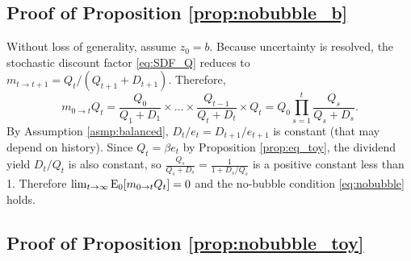 \documentclass[a4paper,12pt]{article}
\numberwithin{equation}{section}
\theoremstyle{plain}
\begin{document}
\subsection{Proof of Proposition \ref{prop:nobubble_b}}

Without loss of generality, assume $z_0=b$. Because uncertainty is resolved, the stochastic discount factor \eqref{eq:SDF_Q} reduces to $m_{t\to t+1}=Q_t/(Q_{t+1}+D_{t+1})$. Therefore,
\begin{equation}
    m_{0\to t}Q_t=\frac{Q_0}{Q_1+D_1}\times\dots\times \frac{Q_{t-1}}{Q_t+D_t}\times Q_t=Q_0\prod_{s=1}^t\frac{Q_s}{Q_s+D_s}. \label{eq:mQ_b}
\end{equation}
By Assumption \ref{asmp:balanced}, $D_t/e_t=D_{t+1}/e_{t+1}$ is constant (that may depend on history). Since $Q_t=\beta e_t$ by Proposition \ref{prop:eq_toy}, the dividend yield $D_t/Q_t$ is also constant, so $\frac{Q_s}{Q_s+D_s}=\frac{1}{1+D_s/Q_s}$ is a positive constant less than 1. Therefore $\lim_{t\to\infty}\operatorname{E}_0[m_{0\to t}Q_t]=0$ and the no-bubble condition \eqref{eq:nobubble} holds. \hfill \qedsymbol

\subsection{Proof of Proposition \ref{prop:nobubble_toy}}
\end{document}
